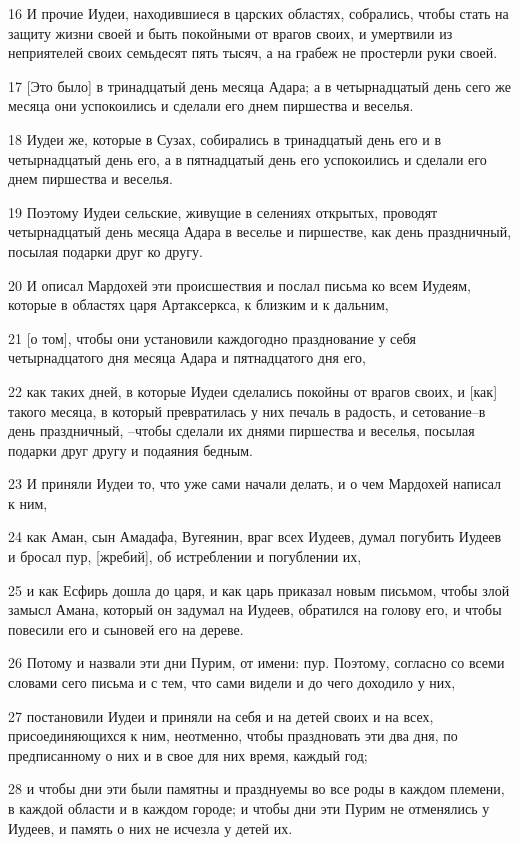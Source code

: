 \par 16 И прочие Иудеи, находившиеся в царских областях, собрались, чтобы стать на защиту жизни своей и быть покойными от врагов своих, и умертвили из неприятелей своих семьдесят пять тысяч, а на грабеж не простерли руки своей.
\par 17 [Это было] в тринадцатый день месяца Адара; а в четырнадцатый день сего же месяца они успокоились и сделали его днем пиршества и веселья.
\par 18 Иудеи же, которые в Сузах, собирались в тринадцатый день его и в четырнадцатый день его, а в пятнадцатый день его успокоились и сделали его днем пиршества и веселья.
\par 19 Поэтому Иудеи сельские, живущие в селениях открытых, проводят четырнадцатый день месяца Адара в веселье и пиршестве, как день праздничный, посылая подарки друг ко другу.
\par 20 И описал Мардохей эти происшествия и послал письма ко всем Иудеям, которые в областях царя Артаксеркса, к близким и к дальним,
\par 21 [о том], чтобы они установили каждогодно празднование у себя четырнадцатого дня месяца Адара и пятнадцатого дня его,
\par 22 как таких дней, в которые Иудеи сделались покойны от врагов своих, и [как] такого месяца, в который превратилась у них печаль в радость, и сетование--в день праздничный, --чтобы сделали их днями пиршества и веселья, посылая подарки друг другу и подаяния бедным.
\par 23 И приняли Иудеи то, что уже сами начали делать, и о чем Мардохей написал к ним,
\par 24 как Аман, сын Амадафа, Вугеянин, враг всех Иудеев, думал погубить Иудеев и бросал пур, [жребий], об истреблении и погублении их,
\par 25 и как Есфирь дошла до царя, и как царь приказал новым письмом, чтобы злой замысл Амана, который он задумал на Иудеев, обратился на голову его, и чтобы повесили его и сыновей его на дереве.
\par 26 Потому и назвали эти дни Пурим, от имени: пур. Поэтому, согласно со всеми словами сего письма и с тем, что сами видели и до чего доходило у них,
\par 27 постановили Иудеи и приняли на себя и на детей своих и на всех, присоединяющихся к ним, неотменно, чтобы праздновать эти два дня, по предписанному о них и в свое для них время, каждый год;
\par 28 и чтобы дни эти были памятны и празднуемы во все роды в каждом племени, в каждой области и в каждом городе; и чтобы дни эти Пурим не отменялись у Иудеев, и память о них не исчезла у детей их.
